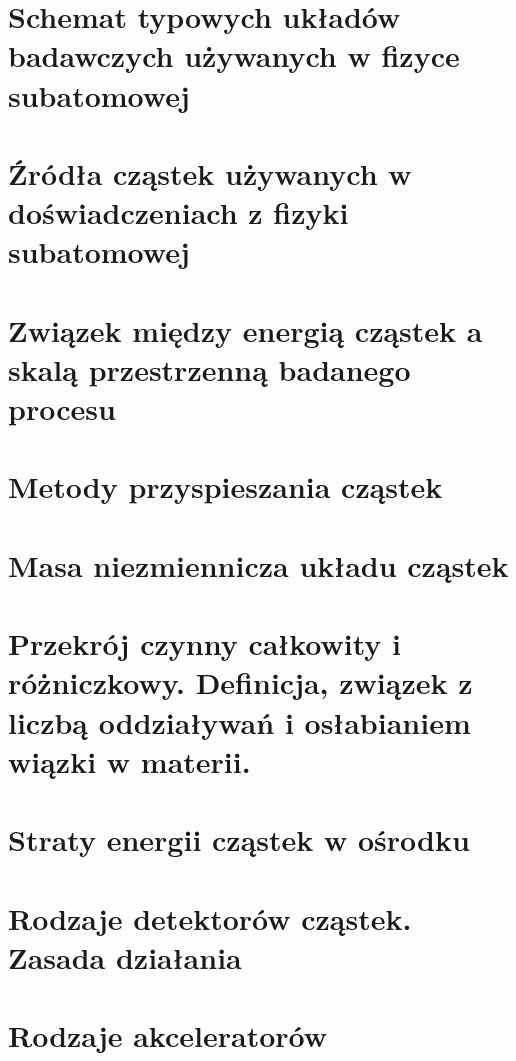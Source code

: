 \documentclass{article}
\begin{document}
\newpage
\section{Schemat typowych układów badawczych używanych w fizyce subatomowej}



\newpage
\section{Źródła cząstek używanych w doświadczeniach z fizyki subatomowej}



\newpage
\section{Związek między energią cząstek a skalą przestrzenną badanego procesu}



\newpage
\section{Metody przyspieszania cząstek}



\newpage
\section{Masa niezmiennicza układu cząstek}



\newpage
\section{Przekrój czynny całkowity i różniczkowy. Definicja, związek z liczbą oddziaływań i osłabianiem wiązki w materii.}



\newpage
\section{Straty energii cząstek w ośrodku}



\newpage
\section{Rodzaje detektorów cząstek. Zasada działania}



\newpage
\section{Rodzaje akceleratorów}
\end{document}
